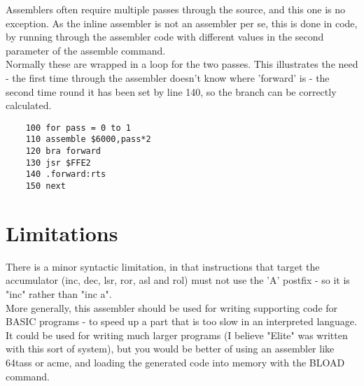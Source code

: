 Assemblers often require multiple passes through the source, and this one is no exception. As the inline assembler is not an assembler per se, this is done in code, by running through the assembler code with different values in the second parameter of the assemble command. \\

Normally these are wrapped in a loop for the two passes. This illustrates the need - the first time through the assembler doesn't know where 'forward' is - the second time round it has been set by line 140, so the branch can be correctly calculated.

\begin{verbatim}
	100 for pass = 0 to 1
	110 assemble $6000,pass*2
	120 bra forward
	130 jsr $FFE2
	140 .forward:rts
	150 next
\end{verbatim}

\section {Limitations}

There is a minor syntactic limitation, in that instructions that target the accumulator (inc, dec, lsr, ror, asl and rol) must not use the 'A' postfix - so it is "inc" rather than "inc a".\\

More generally, this assembler should be used for writing supporting code for BASIC programs - to speed up a part that is too slow in an interpreted language. It could be used for writing much larger programs (I believe "Elite" was written with this sort of system), but you would be better of using an assembler like 64tass or acme, and loading the generated code into memory with the BLOAD command.


